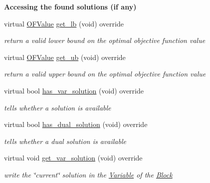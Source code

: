 \begin{Indent}\textbf{ Accessing the found solutions (if any)}\par
\begin{DoxyCompactItemize}
\item 
virtual \mbox{\hyperlink{class_s_m_spp__di__unipi__it_1_1_solver_ab8ce6bff9c21fdcd41e355167209301a}{O\+F\+Value}} \mbox{\hyperlink{class_s_m_spp__di__unipi__it_1_1_m_c_f_solver_a064e49220c7f623cd53edbee8313c753}{get\+\_\+lb}} (void) override
\begin{DoxyCompactList}\small\item\em return a valid lower bound on the optimal objective function value \end{DoxyCompactList}\item 
virtual \mbox{\hyperlink{class_s_m_spp__di__unipi__it_1_1_solver_ab8ce6bff9c21fdcd41e355167209301a}{O\+F\+Value}} \mbox{\hyperlink{class_s_m_spp__di__unipi__it_1_1_m_c_f_solver_a106686dbd21fcdd86e42130d39a7ec2f}{get\+\_\+ub}} (void) override
\begin{DoxyCompactList}\small\item\em return a valid upper bound on the optimal objective function value \end{DoxyCompactList}\item 
virtual bool \mbox{\hyperlink{class_s_m_spp__di__unipi__it_1_1_m_c_f_solver_ade6d8078e2b6708ea0fa989629de2419}{has\+\_\+var\+\_\+solution}} (void) override
\begin{DoxyCompactList}\small\item\em tells whether a solution is available \end{DoxyCompactList}\item 
virtual bool \mbox{\hyperlink{class_s_m_spp__di__unipi__it_1_1_m_c_f_solver_ac179f31ab4f3e55a7f03b152d065edbd}{has\+\_\+dual\+\_\+solution}} (void) override
\begin{DoxyCompactList}\small\item\em tells whether a dual solution is available \end{DoxyCompactList}\item 
virtual void \mbox{\hyperlink{class_s_m_spp__di__unipi__it_1_1_m_c_f_solver_ac83fa9679882440d13fb5940494699c5}{get\+\_\+var\+\_\+solution}} (void) override
\begin{DoxyCompactList}\small\item\em write the \char`\"{}current\char`\"{} solution in the \mbox{\hyperlink{class_s_m_spp__di__unipi__it_1_1_variable}{Variable}} of the \mbox{\hyperlink{class_s_m_spp__di__unipi__it_1_1_block}{Block}} \end{DoxyCompactList}\item 

\end{DoxyCompactItemize}
\end{Indent}
